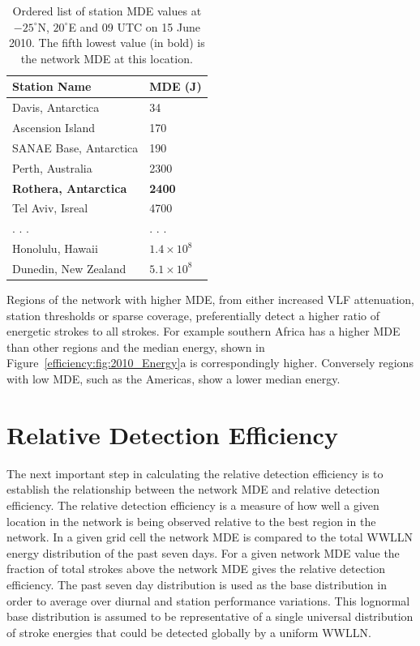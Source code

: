 \begin{table}[ht!]
\caption{Ordered list of station MDE values at $-25^\circ$N, $20^\circ$E and 09 UTC on 15 June 2010.
The fifth lowest value (in bold) is the network MDE at this location.}
\begin{center}
\begin{tabular}{p{2in}p{1in}}
\hline
Station Name 		& 	MDE (J)\\
\hline
\rule{0pt}{3ex}
Davis, Antarctica	&	34\\
Ascension Island	&	170\\
SANAE Base, Antarctica	&	190\\
Perth, Australia	&	2300\\
{\bf Rothera, Antarctica}	&	{\bf 2400}\\
Tel Aviv, Isreal	&	4700\\
. . .	&	. . .\\
Honolulu, Hawaii	&	$1.4 \times 10^8$\\
Dunedin, New Zealand	&	$5.1 \times 10^8$\\
\hline
\end{tabular}
\end{center}
\label{efficiency:table:mdeTable}
\end{table}

Regions of the network with higher MDE, from either increased VLF attenuation, station thresholds or sparse coverage, preferentially detect a higher ratio of energetic strokes to all strokes.
For example southern Africa has a higher MDE than other regions and the median energy, shown in Figure~\ref{efficiency:fig:2010_Energy}a is correspondingly higher.
Conversely regions with low MDE, such as the Americas, show a lower median energy.

\section{Relative Detection Efficiency}

The next important step in calculating the relative detection efficiency is to establish the relationship between the network MDE and relative detection efficiency.
The relative detection efficiency is a measure of how well a given location in the network is being observed relative to the best region in the network.
In a given grid cell the network MDE is compared to the total WWLLN energy distribution of the past seven days.
For a given network MDE value the fraction of total strokes above the network MDE gives the relative detection efficiency.
The past seven day distribution is used as the base distribution in order to average over diurnal and station performance variations.
This lognormal base distribution is assumed to be representative of a single universal distribution of stroke energies that could be detected globally by a uniform WWLLN.

